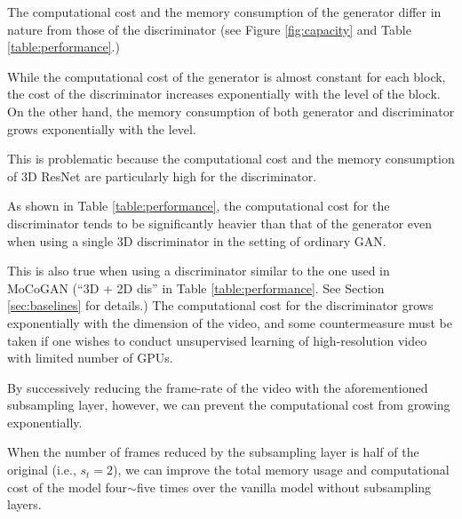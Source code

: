 \documentclass[twocolumn]{svjour3}
\def\Fig#1{Figure \ref{fig:#1}}
\def\Table#1{Table \ref{table:#1}}
\def\Sec#1{Section \ref{sec:#1}}
\begin{document}
The computational cost and the memory consumption of the generator differ in nature from those of the discriminator (see \Fig{capacity} and \Table{performance}.)














While the computational cost of the generator is
almost constant for each block, the cost of the discriminator
increases exponentially with the level of the block.
On the other hand, the memory consumption of both generator and discriminator grows exponentially with the level.


This is problematic because the computational cost and the memory consumption of 3D ResNet are particularly high for the discriminator.








As shown in \Table{performance}, the computational cost for the discriminator tends to be significantly heavier than that of the generator
even when using a single 3D discriminator in the setting of ordinary GAN.



This is also true when using a discriminator similar to the one used in MoCoGAN
(``3D + 2D dis'' in \Table{performance}. See \Sec{baselines} for details.)
The computational cost for the discriminator grows exponentially with the dimension of the video,
and some countermeasure must be taken if one wishes to conduct unsupervised learning of high-resolution video with limited number of GPUs.
















By successively reducing the frame-rate of the video with the aforementioned subsampling layer,
however, we can prevent the computational cost from growing exponentially.




When the number of frames reduced by the subsampling layer is
half of the original (i.e., $s_t=2$), we can improve the total memory usage
and computational cost of the model four$\sim$five times over the vanilla model without subsampling layers.
\end{document}
